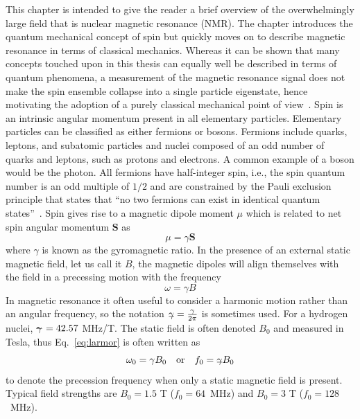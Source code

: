 This chapter is intended to give the reader a brief overview of the overwhelmingly large field that is nuclear magnetic resonance (NMR). The chapter introduces the quantum mechanical concept of spin but quickly moves on to describe magnetic resonance in terms of classical mechanics. Whereas it can be shown that many concepts touched upon in this thesis can equally well be described in terms of quantum phenomena, a measurement of the magnetic resonance signal does not make the spin ensemble collapse into a single particle eigenstate, hence motivating the adoption of a purely classical mechanical point of view~\cite{Hanson2008}.
Spin is an intrinsic angular momentum present in all elementary particles. Elementary particles can be classified as either fermions or bosons. Fermions include quarks, leptons, and subatomic particles and nuclei composed of an odd number of quarks and leptons, such as protons and electrons. A common example of a boson would be the photon. All fermions have half-integer spin, i.e., the spin quantum number is an odd multiple of $1/2$ and are constrained by the Pauli exclusion principle that states that ``no two fermions can exist in identical quantum states''~\cite{Krane1988}. Spin gives rise to a magnetic dipole moment $\mu$ which is related to net spin angular momentum $\textbf{S}$ as
\begin{equation}
    \label{eq:spinmoment}
    \mu = \gamma\textbf{S}
\end{equation} where $\gamma$ is known as the gyromagnetic ratio. In the presence of an external static magnetic field, let us call it $B$, the magnetic dipoles will align themselves with the field in a precessing motion with the frequency
\begin{equation}
    \label{eq:larmor}
    \omega = \gamma B
\end{equation}
In magnetic resonance it often useful to consider a harmonic motion rather than an angular frequency, so the notation $\gbar = \frac{\gamma}{2\pi}$ is sometimes used. For a hydrogen nuclei, $\gamma\kern-1.5ex- = 42.57$ MHz/T. The static field is often denoted $B_0$ and measured in Tesla, thus Eq.~\ref{eq:larmor} is often written as
\begin{equation}
    \omega_0 = \gamma B_0 \quad \textrm{or} \quad f_0 = \gbar B_0
\end{equation}
to denote the precession frequency when only a static magnetic field is present. Typical field strengths are $B_0 = 1.5$ T ($f_0 = 64$~MHz) and $B_0 = 3$ T ($f_0 = 128$~MHz).

